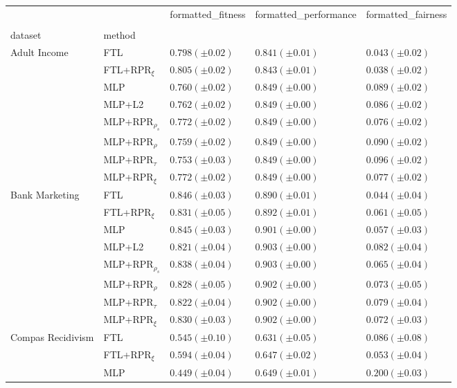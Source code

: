 \begin{tabular}{lllll}
\toprule
 &  & formatted_fitness & formatted_performance & formatted_fairness \\
 &  &  &  &  \\
dataset & method &  &  &  \\
\midrule
\multirow[t]{8}{*}{Adult Income} & FTL & $0.798 (\pm0.02)$ & $0.841 (\pm0.01)$ & $0.043 (\pm0.02)$ \\
 & FTL+RPR$_{\xi}$ & $0.805 (\pm0.02)$ & $0.843 (\pm0.01)$ & $0.038 (\pm0.02)$ \\
 & MLP & $0.760 (\pm0.02)$ & $0.849 (\pm0.00)$ & $0.089 (\pm0.02)$ \\
 & MLP+L2 & $0.762 (\pm0.02)$ & $0.849 (\pm0.00)$ & $0.086 (\pm0.02)$ \\
 & MLP+RPR$_{\rho_s}$ & $0.772 (\pm0.02)$ & $0.849 (\pm0.00)$ & $0.076 (\pm0.02)$ \\
 & MLP+RPR$_{\rho}$ & $0.759 (\pm0.02)$ & $0.849 (\pm0.00)$ & $0.090 (\pm0.02)$ \\
 & MLP+RPR$_{\tau}$ & $0.753 (\pm0.03)$ & $0.849 (\pm0.00)$ & $0.096 (\pm0.02)$ \\
 & MLP+RPR$_{\xi}$ & $0.772 (\pm0.02)$ & $0.849 (\pm0.00)$ & $0.077 (\pm0.02)$ \\
\cline{1-5}
\multirow[t]{8}{*}{Bank Marketing} & FTL & $0.846 (\pm0.03)$ & $0.890 (\pm0.01)$ & $0.044 (\pm0.04)$ \\
 & FTL+RPR$_{\xi}$ & $0.831 (\pm0.05)$ & $0.892 (\pm0.01)$ & $0.061 (\pm0.05)$ \\
 & MLP & $0.845 (\pm0.03)$ & $0.901 (\pm0.00)$ & $0.057 (\pm0.03)$ \\
 & MLP+L2 & $0.821 (\pm0.04)$ & $0.903 (\pm0.00)$ & $0.082 (\pm0.04)$ \\
 & MLP+RPR$_{\rho_s}$ & $0.838 (\pm0.04)$ & $0.903 (\pm0.00)$ & $0.065 (\pm0.04)$ \\
 & MLP+RPR$_{\rho}$ & $0.828 (\pm0.05)$ & $0.902 (\pm0.00)$ & $0.073 (\pm0.05)$ \\
 & MLP+RPR$_{\tau}$ & $0.822 (\pm0.04)$ & $0.902 (\pm0.00)$ & $0.079 (\pm0.04)$ \\
 & MLP+RPR$_{\xi}$ & $0.830 (\pm0.03)$ & $0.902 (\pm0.00)$ & $0.072 (\pm0.03)$ \\
\cline{1-5}
\multirow[t]{8}{*}{Compas Recidivism} & FTL & $0.545 (\pm0.10)$ & $0.631 (\pm0.05)$ & $0.086 (\pm0.08)$ \\
 & FTL+RPR$_{\xi}$ & $0.594 (\pm0.04)$ & $0.647 (\pm0.02)$ & $0.053 (\pm0.04)$ \\
 & MLP & $0.449 (\pm0.04)$ & $0.649 (\pm0.01)$ & $0.200 (\pm0.03)$ \\

\end{tabular}
